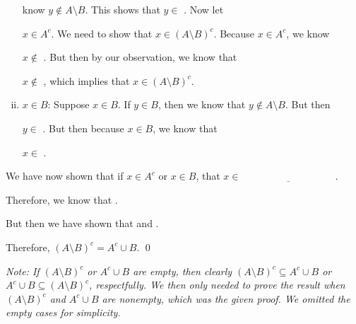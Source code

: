 \documentclass[12pt,letterpaper]{exam}
\begin{document}
\begin{questions}
\begin{enumerate}[(i)]
	know $y \notin A \setminus B$. This shows that $y \in$ \underline{\hspace{4cm}}. Now let \pspace
	
	$x \in A^c$. We need to show that $x \in (A \setminus B)^c$. Because $x \in A^c$, we know \pspace
	
	$x \notin$ \underline{\hspace{4cm}}. But then by our observation, we know that \pspace
	
	$x \notin$ \underline{\hspace{4cm}}, which implies that $x \in (A \setminus B)^c$. \pspace
	
	\item $x \in B$: Suppose $x \in B$. If $y \in B$, then we know that $y \notin A \setminus B$. But then \pspace
	
	$y \in$ \underline{\hspace{4cm}}. But then because $x \in B$, we know that \pspace
	
	$x \in$ \underline{\hspace{4cm}}. 
	\end{enumerate} \pvspace{1cm}

We have now shown that if $x \in A^c$ or $x \in B$, that $x \in \underline{\hspace{4cm}}$. \pspace

Therefore, we know that \underline{\hspace{4cm}}. \pvspace{1.5cm}

But then we have shown that \underline{\hspace{4cm}} and \underline{\hspace{4cm}}. \pspace

Therefore, $(A \setminus B)^c= A^c \cup B$. \qed \vfill

{\small \itshape Note: If $(A \setminus B)^c$ or $A^c \cup B$ are empty, then clearly $(A \setminus B)^c \subseteq A^c \cup B$ or $A^c \cup B \subseteq (A \setminus B)^c$, respectfully. We then only needed to prove the result when $(A \setminus B)^c$ and $A^c \cup B$ are nonempty, which was the given proof. We omitted the empty cases for simplicity.}




\end{questions}
\end{document}
